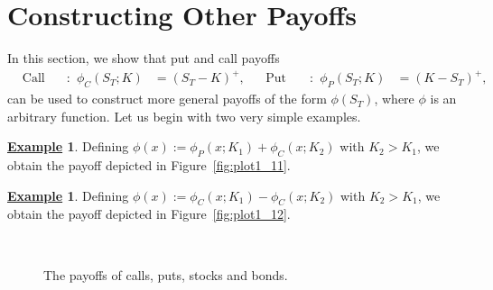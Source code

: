 \documentclass[12pt]{book}
\let\varphi\phi
\numberwithin{equation}{chapter}
\theoremstyle{plain}
\numberwithin{theorem}{section}
\theoremstyle{definition}
\newtheorem{example}[theorem]{\underline{Example}}
\numberwithin{exercise}{chapter}
\newcommand{\<}{\langle}
\renewcommand{\>}{\rangle}
\renewcommand{\(}{\left(}
\renewcommand{\)}{\right)}
\renewcommand{\[}{\left[}
\renewcommand{\]}{\right]}
\theoremstyle{definition}
\numberwithin{question}{section}
\begin{document}
\section{Constructing Other Payoffs}
\label{sec:payoff_construction}
In this section, we show that put and call payoffs
\begin{align}
	&\text{Call Payoffs}: &
	\phi_C (S_T;K) &= (S_T - K)^+ , &
	&\text{Put Payoffs}:
	&\phi_P (S_T;K)& = (K - S_T)^+ ,
\end{align}
can be used to construct more general payoffs of the form $\phi(S_T)$, where $\phi$ is an arbitrary function. Let us begin with two very simple examples.
\begin{example}
Defining $\varphi(x) := \varphi_{P}(x;K_1) + \varphi_{C}(x;K_2)$ with $K_2 > K_1$, we obtain the payoff depicted in Figure~\ref{fig:plot1_11}.
\end{example}
\begin{example}
Defining $\varphi(x) := \varphi_{C}(x;K_1) - \varphi_{C}(x;K_2)$ with $K_2 > K_1$, we obtain the payoff depicted in Figure~\ref{fig:plot1_12}.
\end{example}
\begin{figure}
    \centering
    \qquad
{}
    \\[1em]
    \qquad
{}
    \caption{The payoffs of calls, puts, stocks and bonds.\label{fig:plot1_10}}
\end{figure}
\end{document}
